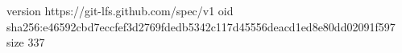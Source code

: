 version https://git-lfs.github.com/spec/v1
oid sha256:e46592cbd7eccfef3d2769fdedb5342c117d45556deacd1ed8e80dd02091f597
size 337
